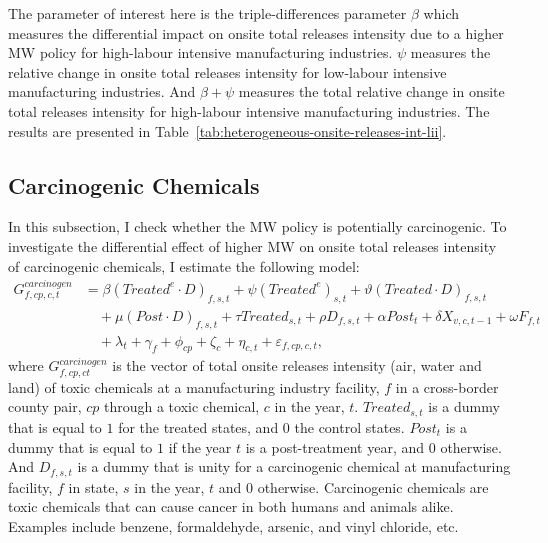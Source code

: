 \documentclass[12pt, english]{article}
\begin{document}
    The parameter of interest here is the triple-differences parameter $\beta$ which measures the differential impact on onsite total releases intensity due to a higher MW policy for high-labour intensive manufacturing industries. $\psi$ measures the relative change in onsite total releases intensity for low-labour intensive manufacturing industries. And $\beta + \psi$ measures the total relative change in onsite total releases intensity for high-labour intensive manufacturing industries. The results are presented in Table~\ref{tab:heterogeneous-onsite-releases-int-lii}.
    

    \subsection{Carcinogenic Chemicals}\label{subsec:carcinogenic-chemicals}
    In this subsection, I check whether the MW policy is potentially carcinogenic. To investigate the differential effect of higher MW on onsite total releases intensity of carcinogenic chemicals, I estimate the following model:
    \begin{align}
        G_{f,cp,c,t}^{carcinogen} &= \beta (Treated^{e} \cdot D)_{f,s,t} + \psi (Treated^{e})_{s,t} + \vartheta (Treated \cdot D)_{f,s,t} \nonumber \\
        &\quad + \mu (Post \cdot D)_{f,s,t} + \tau Treated_{s,t} + \rho D_{f,s,t} + \alpha Post_{t} + \delta X_{v,c,t-1} + \omega F_{f,t} \nonumber \\
        &\quad + \lambda_{t} + \gamma_{f} + \phi_{cp} + \zeta_{c} + \eta_{c,t} + \varepsilon_{f,cp,c,t},\label{eq:heterogeneous-onsite-releases-intensity-carcinogens}
    \end{align}
    where $G_{f,cp,ct}^{carcinogen}$ is the vector of total onsite releases intensity (air, water and land) of toxic chemicals at a manufacturing industry facility, $f$ in a cross-border county pair, $cp$ through a toxic chemical, $c$ in the year, $t$. $Treated_{s,t}$ is a dummy that is equal to $1$ for the treated states, and $0$ the control states. $Post_{t}$ is a dummy that is equal to $1$ if the year $t$ is a post-treatment year, and $0$ otherwise. And $D_{f,s,t}$ is a dummy that is unity for a carcinogenic chemical at manufacturing facility, $f$ in state, $s$ in the year, $t$ and $0$ otherwise. Carcinogenic chemicals are toxic chemicals that can cause cancer in both humans and animals alike. Examples include benzene, formaldehyde, arsenic, and vinyl chloride, etc.
    
\end{document}
